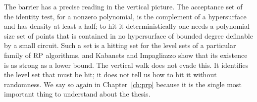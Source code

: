The barrier has a precise reading in the vertical picture. The acceptance set of the identity test, for a nonzero polynomial, is the complement of a hypersurface and has density at least a half; to hit it deterministically one needs a polynomial size set of points that is contained in no hypersurface of bounded degree definable by a small circuit. Such a set is a hitting set for the level sets of a particular family of $\mathrm{RP}$ algorithms, and Kabanets and Impagliazzo show that its existence is as strong as a lower bound. The vertical walk does not evade this. It identifies the level set that must be hit; it does not tell us how to hit it without randomness. We say so again in Chapter~\ref{ch:prp} because it is the single most important thing to understand about the thesis.
